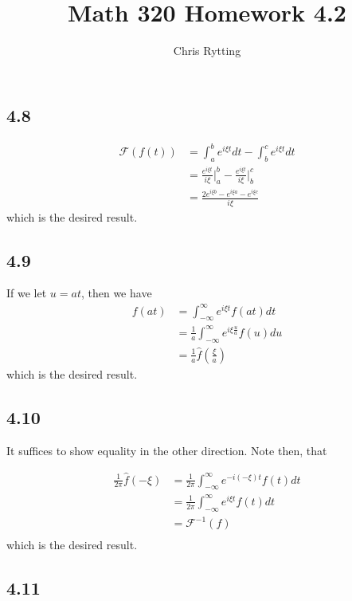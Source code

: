 \documentclass[letterpaper,12pt]{article}
\theoremstyle{definition}
\begin{document}
\title{Math 320 Homework 4.2}
\author{Chris Rytting}
\maketitle


\subsection*{4.8}


\begin{align*}
    \mathscr{F}(f(t)) & = \int^b_a e^{i \xi t} dt - \int _b ^c e^{i \xi t}dt \\
    & = \frac{e^{i \xi t}}{i \xi} \big| ^b _a -  \frac{e^{i \xi t}}{i \xi}\big| ^c _b  \\
    & = \frac{2e^{i\xi b} - e^{i\xi a} - e^{i\xi c}}{i \xi}
\end{align*}
        which is the desired result.

\subsection*{4.9}


If we let $u = at$, then we have
\begin{align*}
    f(at) & = \int^\infty _{-\infty} e^{i \xi t} f(at) dt \\
    & = \frac{1}{a}\int^\infty _{-\infty} e^{i \xi \frac{u}{a}} f(u) du \\
    & = \frac{1}{a} \hat f(\frac{\xi}{a})
\end{align*}
        which is the desired result.

\subsection*{4.10}

It suffices to show equality in the other direction. Note then, that

\begin{align*}
    \frac{1}{2\pi} \hat f(-\xi) & = \frac{1}{2 \pi} \int ^\infty_{-\infty} e^{-i(-\xi )t}f(t)dt \\
    & =  \frac{1}{2 \pi} \int ^\infty_{-\infty} e^{i\xi t}f(t)dt \\
    & = \mathscr{F}^{-1}(f)\\
\end{align*}
        which is the desired result.

\subsection*{4.11}
\end{document}

